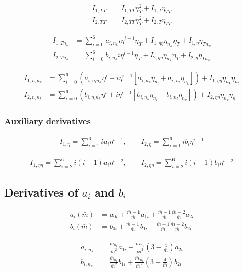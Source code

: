 \documentclass[internal,english]{sintefmemo2012}
\newcommand{\lp}{\left(}
\newcommand{\rp}{\right)}
\begin{document}
\begin{align}
  I_{1,TT} &= I_{1,T T} \eta_{T}^2 + I_{1,T} \eta_{TT} \\
  I_{2,TT} &= I_{2,T T} \eta_{T}^2 + I_{2,T} \eta_{TT}
\end{align}

\begin{align}
  I_{1,T n_k} &= \sum_{i=0}^6 a_{i,n_k} i \eta^{i-1} \eta_T + I_{1,\eta\eta} \eta_{n_k} \eta_T + I_{1,\eta} \eta_{T n_k} \\
  I_{2,T n_k} &= \sum_{i=0}^6 b_{i,n_k} i \eta^{i-1} \eta_T + I_{2,\eta\eta} \eta_{n_k} \eta_T + I_{2,\eta} \eta_{T n_k}
\end{align}

\begin{align}
  I_{1,n_l n_k} &= \sum_{i=0}^6 (a_{i,n_l n_k} \eta^i + i \eta^{i-1} [a_{i,n_k} \eta_{n_l} + a_{i,n_l} \eta_{n_k}]) + I_{1,\eta\eta} \eta_{n_k} \eta_{n_l} \\
  I_{2,n_l n_k} &= \sum_{i=0}^6 (b_{i,n_l n_k} \eta^i + i \eta^{i-1} [b_{i,n_k} \eta_{n_l} + b_{i,n_l} \eta_{n_k}]) + I_{2,\eta\eta} \eta_{n_k} \eta_{n_l}
\end{align}

\subsubsection*{Auxiliary derivatives}
\begin{align}
  I_{1,\eta} = \sum_{i=1}^6 i a_{i} \eta^{i-1}, \qquad I_{2,\eta} = \sum_{i=1}^6 i b_{i} \eta^{i-1}
\end{align}

\begin{align}
  I_{1,\eta\eta} = \sum_{i=2}^6 i (i-1) a_{i} \eta^{i-2}, \qquad I_{2,\eta\eta} = \sum_{i=2}^6 i (i-1) b_{i} \eta^{i-2}
\end{align}


\subsection{Derivatives of $a_i$ and $b_i$}
\begin{align}
  a_i(\bar m) &= a_{0i} + \frac{\bar m -1}{\bar m}a_{1i} + \frac{\bar m -1}{\bar m} \frac{\bar m -2}{\bar m}a_{2i} \\
  b_i(\bar m) &= b_{0i} + \frac{\bar m -1}{\bar m}b_{1i} + \frac{\bar m -1}{\bar m} \frac{\bar m -2}{\bar m}b_{2i}
\end{align}

\begin{align}
  a_{i,n_k} &= \frac{\bar m_{n_k}}{\bar m^2} a_{1i} + \frac{\bar m_{n_k}}{\bar m^2} \lp 3- \frac{4}{\bar m}\rp a_{2i} \\
  b_{i,n_k} &= \frac{\bar m_{n_k}}{\bar m^2} b_{1i} + \frac{\bar m_{n_k}}{\bar m^2} \lp 3- \frac{4}{\bar m}\rp b_{2i}
\end{align}
\end{document}
